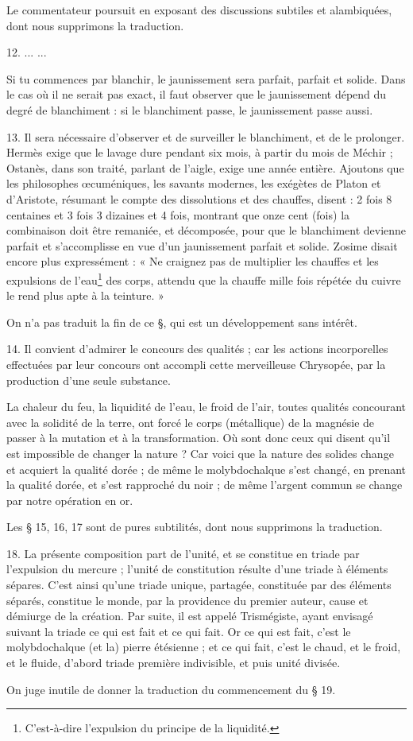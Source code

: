 \documentclass[a4paper, 11pt, oneside, polutonikogreek, french]{article}
\begin{document}
Le commentateur poursuit en exposant des discussions subtiles et alambiquées, dont nous supprimons la traduction.

12. ... ...

Si tu commences par blanchir, le jaunissement sera parfait, parfait et solide. Dans le cas où il ne serait pas exact, il faut observer que le jaunissement dépend du degré de blanchiment : si le blanchiment passe, le jaunissement passe aussi.

13. Il sera nécessaire d'observer et de surveiller le blanchiment, et de le prolonger. Hermès exige que le lavage dure pendant six mois, à partir du mois de Méchir ; Ostanès, dans son traité, parlant de l'aigle, exige une année entière. Ajoutons que les philosophes œcuméniques, les savants modernes, les exégètes de Platon et d'Aristote, résumant le compte des dissolutions et des chauffes, disent : 2 fois 8 centaines et 3 fois 3 dizaines et 4 fois, montrant que onze cent (fois) la combinaison doit être remaniée, et décomposée, pour que le blanchiment devienne parfait et s'accomplisse en vue d'un jaunissement parfait et solide. Zosime disait encore plus expressément : « Ne craignez pas de multiplier les chauffes et les expulsions de l'eau\footnote{C'est-à-dire l'expulsion du principe de la liquidité.} des corps, attendu que la chauffe mille fois répétée du cuivre le rend plus apte à la teinture. »

On n'a pas traduit la fin de ce §, qui est un développement sans intérêt.

14. Il convient d'admirer le concours des qualités ; car les actions incorporelles effectuées par leur concours ont accompli cette merveilleuse Chrysopée, par la production d'une seule substance.

La chaleur du feu, la liquidité de l'eau, le froid de l'air, toutes qualités concourant avec la solidité de la terre, ont forcé le corps (métallique) de la magnésie de passer à la mutation et à la transformation. Où sont donc ceux qui disent qu'il est impossible de changer la nature ? Car voici que la nature des solides change et acquiert la qualité dorée ; de même le molybdochalque s'est changé, en prenant la qualité dorée, et s'est rapproché du noir ; de même l'argent commun se change par notre opération en or.

Les § 15, 16, 17 sont de pures subtilités, dont nous supprimons la traduction.

18. La présente composition part de l'unité, et se constitue en triade par l'expulsion du mercure ; l'unité de constitution résulte d'une triade à éléments sépares. C'est ainsi qu'une triade unique, partagée, constituée par des éléments séparés, constitue le monde, par la providence du premier auteur, cause et démiurge de la création. Par suite, il est appelé Trismégiste, ayant envisagé suivant la triade ce qui est fait et ce qui fait. Or ce qui est fait, c'est le molybdochalque (et la) pierre étésienne ; et ce qui fait, c'est le chaud, et le froid, et le fluide, d'abord triade première indivisible, et puis unité divisée.
\begin{center}
On juge inutile de donner la traduction du commencement du § 19.
\end{center}
\end{document}
